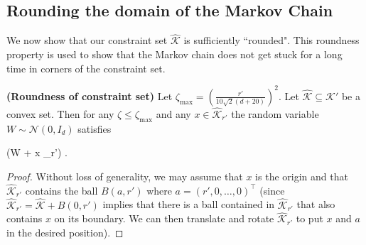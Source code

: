 \documentclass[final,12pt]{colt2018} %
\def \be{\begin{equs}}
\def \ee{\end{equs}}
\begin{document}
{\subsection{Rounding the domain of the Markov Chain}
We now show that our constraint set $\hat{\mathcal{K}}$ is sufficiently ``rounded".  This roundness property is used to show that the Markov chain does not get stuck for a long time in corners of the constraint set.
\begin{lemma} \label{lemma:contraint_round} \textbf{(Roundness of constraint set)}
%
Let $\zeta_{\mathrm{max}} =  (\frac{r'}{10\sqrt{2}(d+20)})^2$. Let $\hat{\mathcal{K}} \subseteq \mathcal{K}'$ be a convex set.  Then for any $\zeta \leq \zeta_{\mathrm{max}}$ and any $x \in \hat{\mathcal{K}}_{r'}$ the random variable $W \sim \mathcal{N}(0, I_d)$ satisfies
%
\be
{}(\sqrt{2\zeta}W + x \in {}_{r'}) \geq {}.
\ee
\end{lemma}
\begin{proof}
%
Without loss of generality, we may assume that $x$ is the origin and that $\hat{\mathcal{K}}_{r'}$ contains the ball $B(a,r')$ where $a=(r', 0,\ldots, 0)^\top$  (since $\hat{\mathcal{K}}_{r'} = \hat{\mathcal{K}}+B(0,r')$  implies that there is a ball contained in $\hat{\mathcal{K}}_{r'}$ that also contains $x$ on its boundary. 
%
 We can then translate and rotate $\hat{\mathcal{K}}_{r'}$ to put $x$ and $a$ in the desired position).


\end{proof}}
\end{document}
